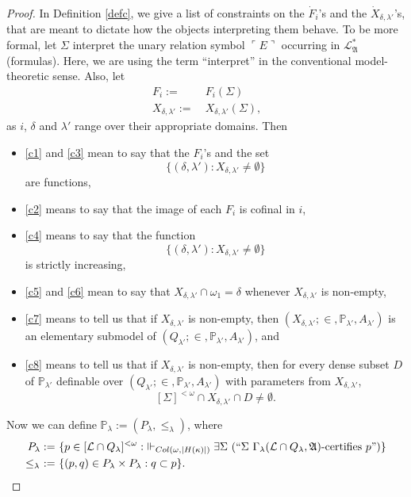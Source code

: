 \documentclass[12pt, twoside]{memoir}
\numberwithin{equation}{section}
\theoremstyle{definition}
\theoremstyle{remark}
\theoremstyle{definition}
\theoremstyle{definition}
\theoremstyle{definition}
\theoremstyle{remark}
\begin{document}
\begin{proof}
In Definition \ref{defc}, we give a list of constraints on the $\dot{F}_i$'s and the $\dot{X}_{\delta, \lambda'}$'s, that are meant to dictate how the objects interpreting them behave. To be more formal, let $\Sigma$ interpret the unary relation symbol $\ulcorner E \urcorner$ occurring in $\mathcal{L}^*_{\mathfrak{A}}$ (formulas). Here, we are using the term ``interpret'' in the conventional model-theoretic sense. Also, let
\begin{align*}
    F_i := \ & F_i(\Sigma) \\
    X_{\delta, \lambda'} := \ & X_{\delta, \lambda'}(\Sigma) \text{,}
\end{align*}
as $i$, $\delta$ and $\lambda'$ range over their appropriate domains. Then
\begin{itemize}
    \item \ref{c1} and \ref{c3} mean to say that the $F_i$'s and the set $$\{(\delta, \lambda') : X_{\delta, \lambda'} \neq \emptyset\}$$ are functions,
    \item \ref{c2} means to say that the image of each $F_i$ is cofinal in $i$,
    \item \ref{c4} means to say that the function $$\{(\delta, \lambda') : X_{\delta, \lambda'} \neq \emptyset\}$$ is strictly increasing,
    \item \ref{c5} and \ref{c6} mean to say that $X_{\delta, \lambda'} \cap \omega_1 = \delta$ whenever $X_{\delta, \lambda'}$ is non-empty,
    \item \ref{c7} means to tell us that if $X_{\delta, \lambda'}$ is non-empty, then $(X_{\delta, \lambda'}; \in,  \mathbb{P}_{\lambda'}, A_{\lambda'})$ is an elementary submodel of $(Q_{\lambda'}; \in,  \mathbb{P}_{\lambda'}, A_{\lambda'})$, and
    \item \ref{c8} means to tell us that if $X_{\delta, \lambda'}$ is non-empty, then for every dense subset $D$ of $\mathbb{P}_{\lambda'}$ definable over $(Q_{\lambda'}; \in, \mathbb{P}_{\lambda'}, A_{\lambda'})$ with parameters from $X_{\delta, \lambda'}$, $$[\Sigma]^{< \omega} \cap X_{\delta, \lambda'} \cap D \neq \emptyset.$$ 
\end{itemize}

Now we can define $\mathbb{P}_{\lambda} := (P_{\lambda}, \leq_{\lambda})$, where
\begin{align*}
    P_{\lambda} := \ & \{p \in [\mathcal{L} \cap Q_{\lambda}]^{< \omega} : \ \Vdash_{Col(\omega, |H(\kappa)|)} \exists \Sigma \ (``\Sigma \ \Gamma_{\lambda} (\mathcal{L} \cap Q_{\lambda}, \mathfrak{A}) \text{-certifies } p")\} \\
    \leq_{\lambda} \ := \ & \{(p, q) \in P_{\lambda} \times P_{\lambda} : q \subset p\}.
\end{align*}


\end{proof}
\end{document}
